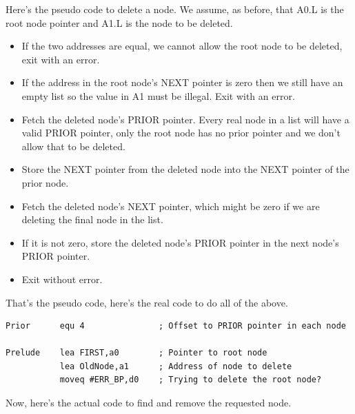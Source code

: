 Here's the pseudo code to delete a node. We assume, as before,
      that A0.L is the root node pointer and A1.L is the node to be
      deleted.
\begin{itemize}[itemsep=0pt]

\item{}If the two addresses are equal, we cannot allow the root node
          to be deleted, exit with an error.


\item{}If the address in the root node's NEXT pointer is zero then we
          still have an empty list so the value in A1 must be illegal. Exit
          with an error.


\item{}Fetch the deleted node's PRIOR pointer. Every real node in a
          list will have a valid PRIOR pointer, only the root node has no
          prior pointer and we don't allow that to be deleted.


\item{}Store the NEXT pointer from the deleted node into the NEXT
          pointer of the prior node.


\item{}Fetch the deleted node's NEXT pointer, which might be zero if
          we are deleting the final node in the list.


\item{}If it is not zero, store the deleted node's PRIOR pointer in
          the next node's PRIOR pointer.


\item{}Exit without error.

\end{itemize}

That's the pseudo code, here's the real code to do all of the
      above.

\begin{lstlisting}[firstnumber=1,caption={Deleting a Node - Prelude},label={lst:DeletingANodePrelude2}]
Prior      equ 4               ; Offset to PRIOR pointer in each node

Prelude    lea FIRST,a0        ; Pointer to root node
           lea OldNode,a1      ; Address of node to delete
           moveq #ERR_BP,d0    ; Trying to delete the root node?
\end{lstlisting}

Now, here's the actual code to find and remove the requested
      node.


